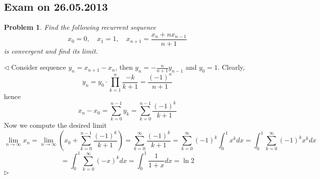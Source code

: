 \documentclass[12pt]{article}
\newtheorem{problem}{Problem}[subsection]
\newenvironment{solution}{\par $\triangleleft$}{$\triangleright$}
\begin{document}
\newpage

\subsection{Exam on 26.05.2013}

\begin{problem} Find the following recurrent sequence
$$
    x_0=0,\quad x_1=1,\quad x_{n+1}=\frac{x_n+nx_{n-1}}{n+1}
$$
is convergent and find its limit.
\end{problem}
\begin{solution} Consider sequence $y_n=x_{n+1}-x_n$, then
    $y_n=-\frac{n}{n+1}y_{n-1}$ and $y_0=1$. Clearly,
    $$
        y_n=y_0\cdot\prod_{k=1}^n\frac{-k}{k+1}=\frac{{(-1)}^n}{n+1}
    $$
    hence
    $$
        x_n-x_0
        =\sum_{k=0}^{n-1} y_k
        =\sum_{k=0}^{n-1} \frac{{(-1)}^k}{k+1}
    $$
    Now we compute the desired limit
    $$
        \lim\limits_{n\to\infty} x_n
        =\lim\limits_{n\to\infty}
        \left(x_0+\sum_{k=0}^{n-1} \frac{{(-1)}^k}{k+1}\right)
        =\sum_{k=0}^\infty\frac{{(-1)}^k}{k+1}
        =\sum_{k=0}^\infty{(-1)}^k\int_0^1 x^k dx
        =\int_0^1\sum_{k=0}^\infty{(-1)}^k x^k dx
    $$
    $$
        =\int_0^1\sum_{k=0}^\infty{(-x)}^k dx
        =\int_0^1\frac{1}{1+x}dx
        =\ln 2
    $$
\end{solution}
\end{document}
